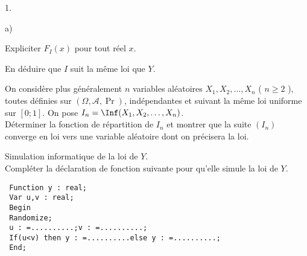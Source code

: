 \documentclass[11pt]{article}%
\begin{document}
\begin{noliste}{1.}
\begin{noliste}{a)}
\item Expliciter $F_{I}(x)$ pour tout réel $x$.

\item En déduire que $I$ suit la même loi que $Y$. \\

\end{noliste}

\item On considère plus généralement $n$ variables aléatoires $X_{1},
X_{2}, \dots, X_{n}$ ( $n \geq 2$ ), toutes définies sur $(\Omega,
\mathcal{A}, \Pr)$, indépendantes et suivant la même loi uniforme sur
$[ 0 ; 1]$. On pose $I_{n} = \Inf ( X_{1}, X_{2}, \dots, X_{n})$. \\
Déterminer la fonction de répartition de $I_{n}$ et montrer que la
suite $(I_{n})$ converge en loi vers une variable aléatoire dont on
précisera la loi. \\

\item Simulation informatique de la loi de $Y$. \\
Compléter la déclaration de fonction suivante pour qu'elle simule la
loi de $Y$. 

\begin{verbatim}
 Function y : real;
 Var u,v : real;
 Begin
 Randomize;
 u : =..........;v : =..........;
 If(u<v) then y : =..........else y : =..........;
 End;
\end{verbatim}
\end{noliste}
\end{document}
